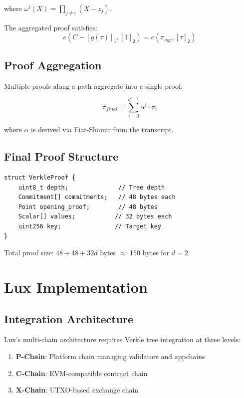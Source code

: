 \documentclass[11pt,a4paper]{article}
\theoremstyle{definition}
\begin{document}
where $\omega^i(X) = \prod_{j \neq i}(X - z_j)$.

The aggregated proof satisfies:
\begin{equation}
    e(C - [g(\tau)]_1, [1]_2) = e(\pi_{agg}, [\tau]_2)
\end{equation}

\subsection{Proof Aggregation}

Multiple proofs along a path aggregate into a single proof:

\begin{equation}
    \pi_{final} = \sum_{i=0}^{d-1} \alpha^i \cdot \pi_i
\end{equation}

where $\alpha$ is derived via Fiat-Shamir from the transcript.

\subsection{Final Proof Structure}

\begin{lstlisting}[caption=Verkle Proof Format]
struct VerkleProof {
    uint8_t depth;              // Tree depth
    Commitment[] commitments;   // 48 bytes each
    Point opening_proof;        // 48 bytes
    Scalar[] values;           // 32 bytes each
    uint256 key;               // Target key
}
\end{lstlisting}

Total proof size: $48 + 48 + 32d$ bytes $\approx$ 150 bytes for $d = 2$.

\section{Lux Implementation}

\subsection{Integration Architecture}

Lux's multi-chain architecture requires Verkle tree integration at three levels:

\begin{enumerate}
    \item \textbf{P-Chain}: Platform chain managing validators and appchains
    \item \textbf{C-Chain}: EVM-compatible contract chain
    \item \textbf{X-Chain}: UTXO-based exchange chain
\end{enumerate}
\end{document}
